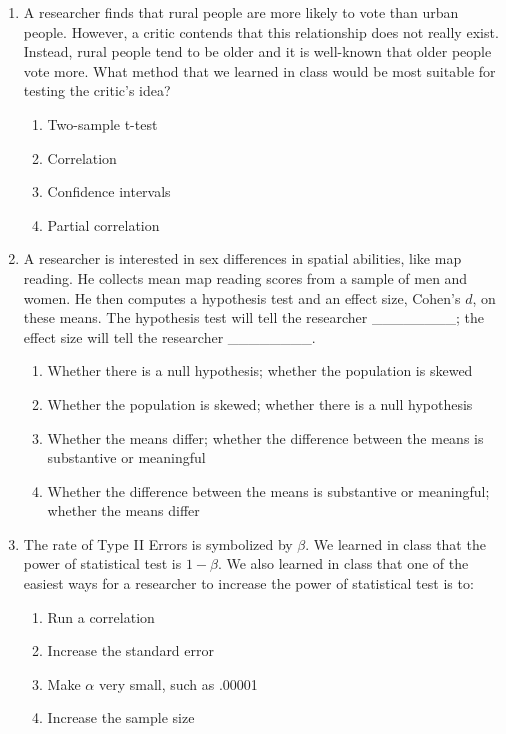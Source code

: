 \documentclass{article}
\begin{document}
\begin{enumerate}[label=\textbf{Q\arabic*:}]
    \item A researcher finds that rural people are more likely to vote than urban people. However, a critic contends that this relationship does not really exist. Instead, rural people tend to be older and it is well-known that older people vote more. What method that we learned in class would be most suitable for testing the critic’s idea?
    \begin{enumerate}[label=\alph*)]
        \item Two-sample t-test
        \item Correlation
        \item Confidence intervals
        \item Partial correlation
    \end{enumerate}

    \item A researcher is interested in sex differences in spatial abilities, like map reading. He collects mean map reading scores from a sample of men and women. He then computes a hypothesis test and an effect size, Cohen’s $d$, on these means. The hypothesis test will tell the researcher \_\_\_\_\_\_\_\_; the effect size will tell the researcher \_\_\_\_\_\_\_\_.
    \begin{enumerate}[label=\alph*)]
        \item Whether there is a null hypothesis; whether the population is skewed
        \item Whether the population is skewed; whether there is a null hypothesis
        \item Whether the means differ; whether the difference between the means is substantive or meaningful
        \item Whether the difference between the means is substantive or meaningful; whether the means differ
    \end{enumerate}

    \item The rate of Type II Errors is symbolized by $\beta$. We learned in class that the power of statistical test is $1 - \beta$. We also learned in class that one of the easiest ways for a researcher to increase the power of statistical test is to:
    \begin{enumerate}[label=\alph*)]
        \item Run a correlation
        \item Increase the standard error
        \item Make $\alpha$ very small, such as .00001
        \item Increase the sample size
    \end{enumerate}


\end{enumerate}
\end{document}
